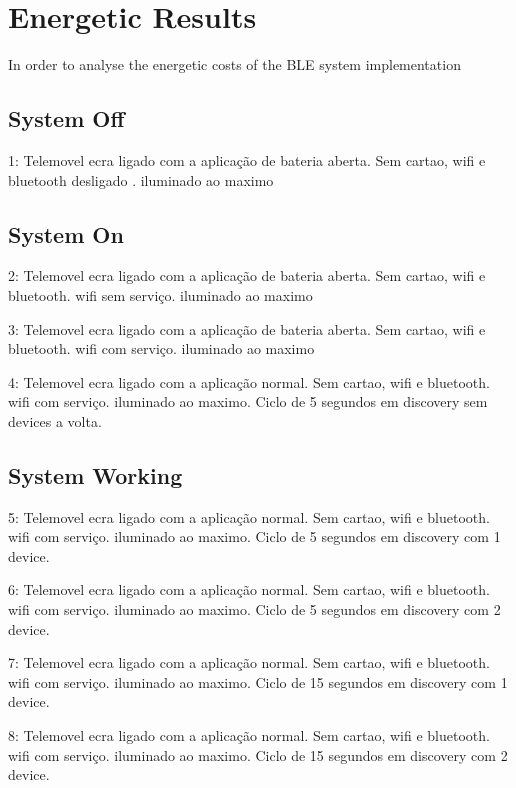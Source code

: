 \section{Energetic Results}
\label{sec:energetic}

In order to analyse the energetic costs of the \ac{BLE} system implementation

\subsection{System Off}
\label{subsec:syson}

1: Telemovel ecra ligado com a aplicação de bateria aberta. Sem cartao, wifi e bluetooth desligado . iluminado ao maximo


\subsection{System On}
\label{subsec:sysoff}

2: Telemovel ecra ligado com a aplicação de bateria aberta. Sem cartao, wifi e bluetooth. wifi sem serviço. iluminado ao maximo

3: Telemovel ecra ligado com a aplicação de bateria aberta. Sem cartao, wifi e bluetooth. wifi com serviço. iluminado ao maximo

4: Telemovel ecra ligado com a aplicação normal. Sem cartao, wifi e bluetooth. wifi com serviço. iluminado ao maximo. Ciclo de 5 segundos em discovery sem devices a volta.

\subsection{System Working}
\label{subsec:syswork}

5: Telemovel ecra ligado com a aplicação normal. Sem cartao, wifi e bluetooth. wifi com serviço. iluminado ao maximo. Ciclo de 5 segundos em discovery com 1 device.

6: Telemovel ecra ligado com a aplicação normal. Sem cartao, wifi e bluetooth. wifi com serviço. iluminado ao maximo. Ciclo de 5 segundos em discovery com 2 device.

7: Telemovel ecra ligado com a aplicação normal. Sem cartao, wifi e bluetooth. wifi com serviço. iluminado ao maximo. Ciclo de 15 segundos em discovery com 1 device.

8: Telemovel ecra ligado com a aplicação normal. Sem cartao, wifi e bluetooth. wifi com serviço. iluminado ao maximo. Ciclo de 15 segundos em discovery com 2 device.


